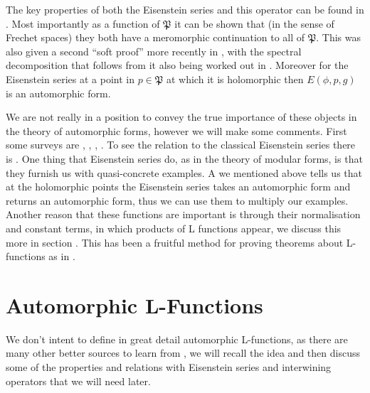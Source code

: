 The key properties of both the Eisenstein series and this operator can be found in \cite[IV.1.8, IV.1.9, IV.1.10, IV.1.11]{moeglinSpectralDecompositionEisenstein1995}. Most importantly as a function of \(\mathfrak{P}\) it can be shown that (in the sense of Frechet spaces) they both have a meromorphic continuation to all of \(\mathfrak{P}\). This was also given a second ``soft proof'' more recently in \cite{bernsteinMeromorphicContinuationEisenstein2022}, with the spectral decomposition that follows from it also being worked out in \cite{delormeSpectralTheoremLanglands2021}. Moreover for the Eisenstein series at a point in \(p\in \mathfrak{P}\) at which it is holomorphic then \(E(\phi,p, g)\) is an automorphic form. 

We are not really in a position to convey the true importance of these objects in the theory of automorphic forms, however we will make some comments. First some surveys are \cite{lapidPerspectivesEisensteinSeries2022}, \cite{arthurEisensteinSeriesTrace1979}, \cite{kimEISENSTEINSERIESTHEIR}, \cite{jiangResiduesEisensteinSeries2008a}. To see the relation to the classical Eisenstein series there is \cite{garrettTransitionEisensteinSeries2016}. One thing that Eisenstein series do, as in the theory of modular forms, is that they furnish us with quasi-concrete examples. A we mentioned above \cite[IV.1.9.(b).i]{moeglinSpectralDecompositionEisenstein1995} tells us that at the holomorphic points the Eisenstein series takes an automorphic form and returns an automorphic form, thus we can use them to multiply our examples. Another reason that these functions are important is through their normalisation and constant terms, in which products of L functions appear, we discuss this more in section . This has been a fruitful method for proving theorems about L-functions as in \cite{shahidiEisensteinSeriesAutomorphic2010}\cite{pollackRANKINSELBERGMETHODUSER}\cite{arthurEisensteinSeriesTrace1979}.


\section{Automorphic L-Functions}
We don't intent to define in great detail automorphic L-functions, as there are many other better sources to learn from \cite[Part 2.III.2]{borelAutomorphicFormsRepresentations1979}\cite{shahidiEisensteinSeriesAutomorphic2010}\cite{cogdellLFUNCTIONSFUNCTORIALITY}\cite[9, 10, 11]{bumpIntroductionLanglandsProgram2004}\cite{arthurLfunctionsAutomorphicRepresenta}, we will recall the idea and then discuss some of the properties and relations with Eisenstein series and interwining operators that we will need later.

